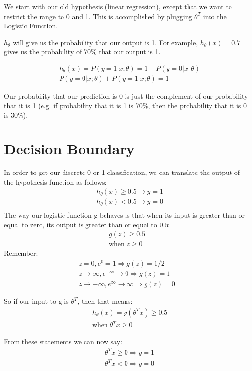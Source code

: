 We start with our old hypothesis (linear regression), except that we want to restrict the range to 0 and 1. This is accomplished by plugging $\theta^T $ into the Logistic Function.

$h_\theta $ will give us the probability that our output is 1. For example, $h_\theta(x)=0.7$ gives us the probability of 70\% that our output is 1.

\begin{align*}
&h_\theta(x) = P(y=1 | x ; \theta) = 1 - P(y=0 | x ; \theta) \\ 
&P(y = 0 | x;\theta) + P(y = 1 | x ; \theta) = 1
\end{align*}

Our probability that our prediction is 0 is just the complement of our probability that it is 1 (e.g. if probability that it is 1 is 70\%, then the probability that it is 0 is 30\%).
\section{Decision Boundary}
In order to get our discrete 0 or 1 classification, we can translate the output of the hypothesis function as follows:
\begin{align*}
& h_\theta(x) \geq 0.5 \rightarrow y = 1 \\
& h_\theta(x) < 0.5 \rightarrow y = 0 \\
\end{align*}
The way our logistic function g behaves is that when its input is greater than or equal to zero, its output is greater than or equal to 0.5:
\begin{align*}
g(z) \geq 0.5 \\
\text{when } z \geq 0
\end{align*}
Remember:
\begin{align*}
z=0,  e^{0}=1 \Rightarrow  g(z)=1/2\\ 
z \to \infty, e^{-\infty} \to 0 \Rightarrow g(z)=1 \\ 
z \to -\infty, e^{\infty}\to \infty \Rightarrow g(z)=0 
\end{align*}

So if our input to g is $\theta^T$, then that means:
\begin{align*}
& h_\theta(x) = g(\theta^T x) \geq 0.5 \\
& \text{when} \; \theta^T x \geq 0
\end{align*}

From these statements we can now say:
\begin{align*}
& \theta^T x \geq 0 \Rightarrow y = 1 \\
& \theta^T x < 0 \Rightarrow y = 0 \\
\end{align*}

